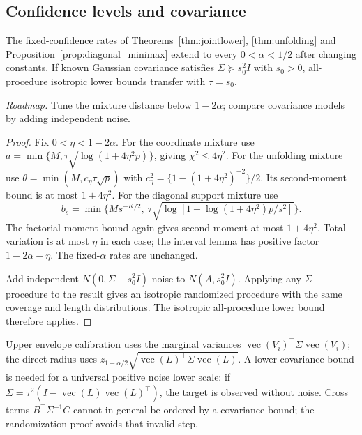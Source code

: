 \subsection{Confidence levels and covariance}
\begin{proposition}\label{prop:levels}
The fixed-confidence rates of Theorems~\ref{thm:jointlower}, \ref{thm:unfolding}
and Proposition~\ref{prop:diagonal_minimax} extend to every $0<\alpha<1/2$
after changing constants.
If known Gaussian covariance satisfies $\Sigma\succeq s_0^2I$ with $s_0>0$,
all-procedure isotropic lower bounds transfer with $\tau=s_0$.
\end{proposition}
\noindent\emph{Roadmap.} Tune the mixture distance below $1-2\alpha$; compare covariance models by adding independent noise.
\begin{proof}
Fix $0<\eta<1-2\alpha$. For the coordinate mixture use
$a=\min\{M,\tau\sqrt{\log(1+4\eta^2p)}\}$, giving $\chi^2\le4\eta^2$.
For the unfolding mixture use $\theta=\min(M,c_\eta\tau\sqrt p)$ with
$c_\eta^2=\{1-(1+4\eta^2)^{-2}\}/2$.
Its second-moment bound is at most $1+4\eta^2$.
For the diagonal support mixture use
\[
 b_s=\min\{Ms^{-K/2},\
 \tau\sqrt{\log[1+\log(1+4\eta^2)p/s^2]}\}.
\]
The factorial-moment bound again gives second moment at most $1+4\eta^2$.
Total variation is at most $\eta$ in each case; the interval lemma has positive factor $1-2\alpha-\eta$. The fixed-$\alpha$ rates are unchanged.

Add independent $N(0,\Sigma-s_0^2I)$ noise to $N(A,s_0^2I)$.
Applying any $\Sigma$-procedure to the result gives an isotropic randomized procedure with the same coverage and length distributions.
The isotropic all-procedure lower bound therefore applies.
\end{proof}
Upper envelope calibration uses the marginal variances
$\operatorname{vec}(V_i)^\top\Sigma\operatorname{vec}(V_i)$;
the direct radius uses
$z_{1-\alpha/2}\sqrt{\operatorname{vec}(L)^\top\Sigma\operatorname{vec}(L)}$.
A lower covariance bound is needed for a universal positive noise lower scale:
if $\Sigma=\tau^2(I-\operatorname{vec}(L)\operatorname{vec}(L)^\top)$,
the target is observed without noise.
Cross terms $B^\top\Sigma^{-1}C$ cannot in general be ordered by a covariance bound; the randomization proof avoids that invalid step.
